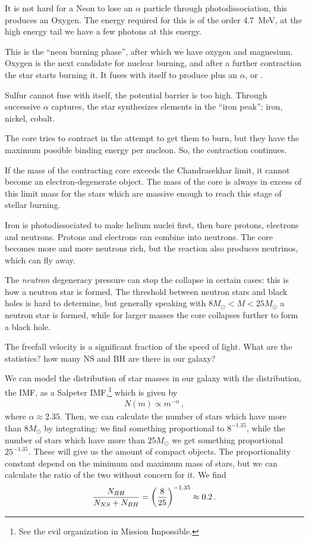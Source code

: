 \documentclass[main.tex]{subfiles}
\begin{document}
It is not hard for a Neon to lose an \(\alpha \) particle through photodissociation, this produces an Oxygen. 
The energy required for this is of the order \SI{4.7}{MeV}, at the high energy tail we have a few photons at this energy. 

This is the ``neon burning phase'', after which we have oxygen and magnesium. Oxygen is the next candidate for nuclear burning, and after a further contraction the star starts burning it. It fuses with itself to produce  plus an \(\alpha \), or .

Sulfur cannot fuse with itself, the potential barrier is too high. 
Through successive \(\alpha \) captures, the star synthesizes elements in the ``iron peak'': iron, nickel, cobalt. 

The core tries to contract in the attempt to get them to burn, but they have the maximum possible binding energy per nucleon. 
So, the contraction continues. 

If the mass of the contracting core exceeds the Chandrasekhar limit, it cannot become an electron-degenerate object. 
The mass of the core is always in excess of this limit mass for the stars which are massive enough to reach this stage of stellar burning. 

Iron is photodissociated to make helium nuclei first, then bare protons, electrons and neutrons. 
Protons and electrons can combine into neutrons. The core becomes more and more neutrons rich, but the reaction also produces neutrinos, which can fly away.

The \emph{neutron} degeneracy pressure can stop the collapse in certain cases: this is how a neutron star is formed. 
The threshold between neutron stars and black holes is hard to determine, but generally speaking with \(8 M_{\odot} < M < 25 M_{\odot}\) a neutron star is formed, while for larger masses the core collapses further to form a black hole. 

The freefall velocity is a significant fraction of the speed of light.
What are the statistics? how many NS and BH are there in our galaxy?

We can model the distribution of star masses in our galaxy with the distribution, the IMF, as a Salpeter IMF,\footnote{See the evil organization in Mission Impossible.} which is given by 
%
\begin{align}
N(m) \propto m^{-\alpha }
\,,
\end{align}
%
where \(\alpha \approx \num{2.35}\). Then, we can calculate the number of stars which have more than \(8 M_{\odot}\) by integrating: we find something proportional to \(8^{-1.35}\), while the number of stars which have more than \(25 M_{\odot}\) we get something proportional \(25^{-1.35}\). These will give us the amount of compact objects.
The proportionality constant depend on the minimum and maximum mass of stars, but we can calculate the ratio of the two without concern for it. We find 
%
\begin{align}
\frac{N_{BH}}{N_{NS} + N_{BH}} = \qty(\frac{8}{25})^{-1.35} \approx \num{.2}
\,.
\end{align}
\end{document}
